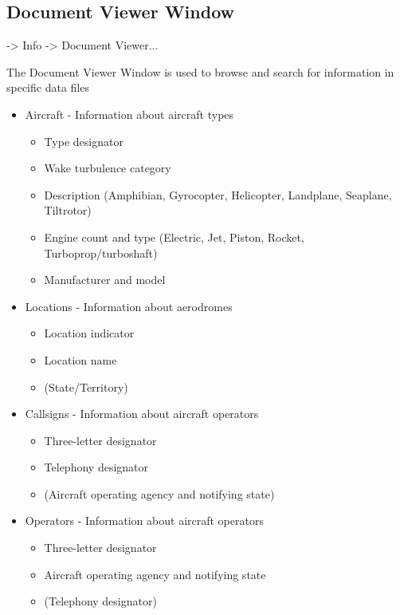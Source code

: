 \documentclass[a4paper,oneside,11pt]{memoir}
\begin{document}
\subsection{Document Viewer Window}
\label{win:dvw}

 -> Info -> Document Viewer...

\bigskip


The Document Viewer Window is used to browse and search for information in specific data files

\begin{itemize}
    \item Aircraft - Information about aircraft types
    \begin{itemize}
        \item Type designator
        \item Wake turbulence category
        \item Description (Amphibian, Gyrocopter, Helicopter, Landplane, Seaplane, Tiltrotor)
        \item Engine count and type (Electric, Jet, Piston, Rocket, Turboprop/turboshaft)
        \item Manufacturer and model
    \end{itemize}
    \item Locations - Information about aerodromes
    \begin{itemize}
        \item Location indicator
        \item Location name
        \item (State/Territory)
    \end{itemize}
    \item Callsigns - Information about aircraft operators
    \begin{itemize}
        \item Three-letter designator
        \item Telephony designator
        \item (Aircraft operating agency and notifying state)
    \end{itemize}   
    \item Operators - Information about aircraft operators
    \begin{itemize}
        \item Three-letter designator
        \item Aircraft operating agency and notifying state
        \item (Telephony designator)
    \end{itemize}
\end{itemize}
\end{document}
